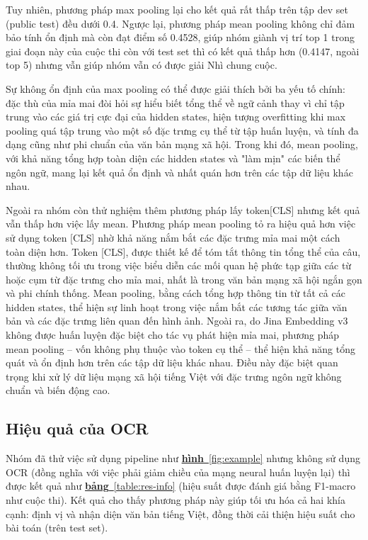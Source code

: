\documentclass[11pt]{article}
\begin{document}
Tuy nhiên, phương pháp max pooling lại cho kết quả rất thấp trên tập dev set (public test) đều dưới 0.4. Ngược lại, phương pháp mean pooling không chỉ đảm bảo tính ổn định mà còn đạt điểm số 0.4528, giúp nhóm giành vị trí top 1 trong giai đoạn này của cuộc thi còn với test set thì có kết quả thấp hơn (0.4147, ngoài top 5) nhưng vẫn giúp nhóm vẫn có được giải Nhì chung cuộc.

Sự không ổn định của max pooling có thể được giải thích bởi ba yếu tố chính: đặc thù của mỉa mai đòi hỏi sự hiểu biết tổng thể về ngữ cảnh thay vì chỉ tập trung vào các giá trị cực đại của hidden states, hiện tượng overfitting khi max pooling quá tập trung vào một số đặc trưng cụ thể từ tập huấn luyện, và tính đa dạng cũng như phi chuẩn của văn bản mạng xã hội. Trong khi đó, mean pooling, với khả năng tổng hợp toàn diện các hidden states và "làm mịn" các biến thể ngôn ngữ, mang lại kết quả ổn định và nhất quán hơn trên các tập dữ liệu khác nhau.

Ngoài ra nhóm còn thử nghiệm thêm phương pháp lấy token[CLS] nhưng kết quả vẫn thấp hơn việc lấy mean. Phương pháp mean pooling tỏ ra hiệu quả hơn việc sử dụng token [CLS] nhờ khả năng nắm bắt các đặc trưng mỉa mai một cách toàn diện hơn. Token [CLS], được thiết kế để tóm tắt thông tin tổng thể của câu, thường không tối ưu trong việc biểu diễn các mối quan hệ phức tạp giữa các từ hoặc cụm từ đặc trưng cho mỉa mai, nhất là trong văn bản mạng xã hội ngắn gọn và phi chính thống. Mean pooling, bằng cách tổng hợp thông tin từ tất cả các hidden states, thể hiện sự linh hoạt trong việc nắm bắt các tương tác giữa văn bản và các đặc trưng liên quan đến hình ảnh. Ngoài ra, do Jina Embedding v3 không được huấn luyện đặc biệt cho tác vụ phát hiện mỉa mai, phương pháp mean pooling – vốn không phụ thuộc vào token cụ thể – thể hiện khả năng tổng quát và ổn định hơn trên các tập dữ liệu khác nhau. Điều này đặc biệt quan trọng khi xử lý dữ liệu mạng xã hội tiếng Việt với đặc trưng ngôn ngữ không chuẩn và biến động cao.
\vspace*{-3mm}
\subsection{Hiệu quả của OCR}
\hspace*{5mm}Nhóm đã thử việc sử dụng pipeline như \hyperref[fig:example]{\textbf{hình}~\ref*{fig:example}} nhưng không sử dụng OCR (đồng nghĩa với việc phải giảm chiều của mạng neural huấn luyện lại) thì được kết quả như \hyperref[table:res-info]{\textbf{bảng}~\ref*{table:res-info}} (hiệu suất được đánh giá bằng F1-macro như cuộc thi). Kết quả cho thấy phương pháp này giúp tối ưu hóa cả hai khía cạnh: định vị và nhận diện văn bản tiếng Việt, đồng thời cải thiện hiệu suất cho bài toán (trên test set).
\vspace*{-3mm}
\end{document}
